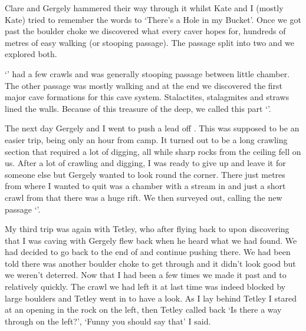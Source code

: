 
Clare and Gergely hammered their way through it whilst Kate and I (mostly Kate) tried to remember the words to ‘There’s a Hole in my Bucket’. Once we got past the boulder choke we discovered what every caver hopes for, hundreds of metres of easy walking (or stooping passage). The passage split into two and we explored both.

‘’ had a few crawls and was generally stooping passage between little chamber. The other passage was mostly walking and at the end we discovered the first major cave formations for this cave system. Stalactites, stalagmites and straws lined the walls. Because of this treasure of the deep, we called this part ‘’.

The next day Gergely and I went to push a lead off . This was supposed to be an easier trip, being only an hour from camp. It turned out to be a long crawling section that required a lot of digging, all while sharp rocks from the ceiling fell on us. After a lot of crawling and digging, I was ready to give up and leave it for someone else but Gergely wanted to look round the corner. There just metres from where I wanted to quit was a chamber with a stream in and just a short crawl from that there was a huge rift. We then surveyed out, calling the new passage ‘’.

My third trip was again with Tetley, who after flying back to  upon discovering that I was caving with Gergely flew back when he heard what we had found. We had decided to go back to the end of  and continue pushing there. We had been told there was another boulder choke to get through and it didn’t look good but we weren’t deterred. Now that I had been a few times we made it past  and to  relatively quickly. The crawl we had left it at last time was indeed blocked by large boulders and Tetley went in to have a look. As I lay behind Tetley I stared at an opening in the rock on the left, then Tetley called back ‘Is there a way through on the left?’, ‘Funny you should say that’ I said.

